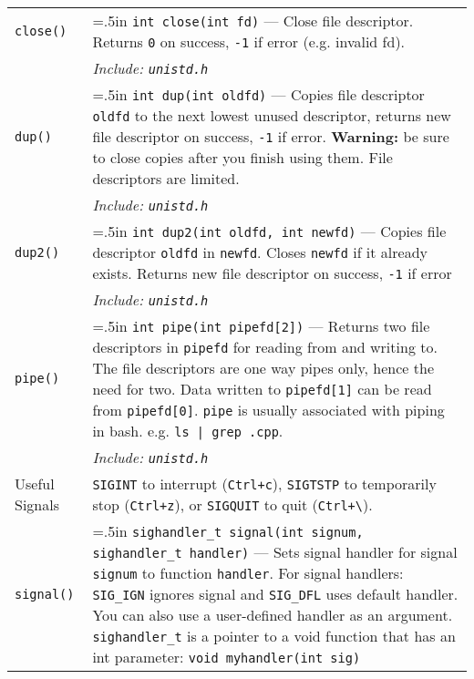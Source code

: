 \documentclass{article}
\newcommand{\indenth}[1][.5]{\hangindent=#1in
                         \hangafter=1 }
\begin{document}
\begin{longtabu}{|p{.9in}|p{6.3in}<{\strut}|}
        \\
    \texttt{close()} & \indenth\texttt{int close(int fd)} --- Close file descriptor. Returns \texttt{0} on success, \texttt{-1} if error (e.g. invalid fd).
        \\
    & \hspace{.5in}\it Include: \rm\texttt{unistd.h}
        \\ \hline
    \texttt{dup()} & \indenth\texttt{int dup(int oldfd)} --- Copies file descriptor \texttt{oldfd} to the next lowest unused descriptor, returns new file descriptor on success, \texttt{-1} if error.
    \newline\hspace{.5in}\textbf{Warning:} be sure to close copies after you finish using them. File descriptors are limited.
        \\
    & \hspace{.5in}\it Include: \rm\texttt{unistd.h}
        \\
    \texttt{dup2()} & \indenth\texttt{int dup2(int oldfd, int newfd)} --- Copies file descriptor \texttt{oldfd} in \texttt{newfd}. Closes \texttt{newfd} if it already exists. Returns new file descriptor on success, \texttt{-1} if error
        \\
    & \hspace{.5in}\it Include: \rm\texttt{unistd.h}
        \\
    \texttt{pipe()} & \indenth\texttt{int pipe(int pipefd[2])} --- Returns two file descriptors in \texttt{pipefd} for reading from and writing to. The file descriptors are one way pipes only, hence the need for two. Data written to \texttt{pipefd[1]} can be read from \texttt{pipefd[0]}. \texttt{pipe} is usually associated with piping in bash. 
    \newline\hspace{.5in}e.g. \texttt{ls | grep .cpp}. 
        \\
    & \hspace{.5in}\it Include: \rm\texttt{unistd.h}
        \\ \hline
    Useful Signals & \texttt{SIGINT} to interrupt (\texttt{Ctrl+c}), \texttt{SIGTSTP} to temporarily stop (\texttt{Ctrl+z}), or \texttt{SIGQUIT} to quit (\texttt{Ctrl+\textbackslash}). \par
        \\
    \texttt{signal()} & \indenth\texttt{sighandler\_t signal(int signum, sighandler\_t handler)} --- Sets signal handler for signal \texttt{signum} to function \texttt{handler}.  For signal handlers: \texttt{SIG\_IGN} ignores signal and \texttt{SIG\_DFL} uses default handler. You can also use a user-defined handler as an argument. \texttt{sighandler\_t} is a pointer to a void function that has an int parameter: \texttt{void myhandler(int sig)}

\end{longtabu}
\end{document}
